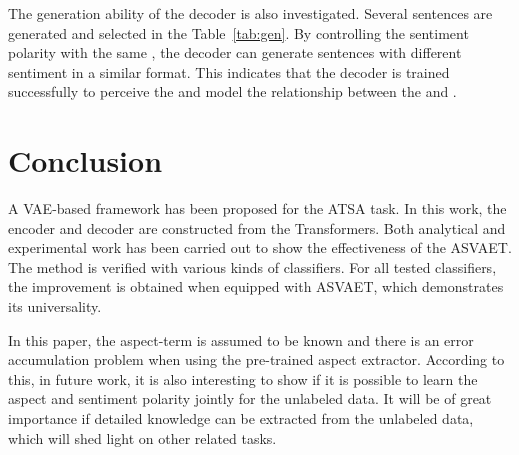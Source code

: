 \documentclass[11pt,a4paper]{article}
\begin{document}
The generation ability of the decoder is also investigated.
Several sentences are generated and selected in the Table~\ref{tab:gen}.
By controlling the sentiment polarity  with the same , the decoder can generate sentences with different sentiment in a similar format.
This indicates that the decoder is trained successfully to perceive the  and model the relationship between the  and .











\section{Conclusion}
A VAE-based framework has been proposed for the ATSA task.
In this work, the encoder and decoder are constructed from the Transformers.  Both analytical and experimental work has been carried out to show the effectiveness of the ASVAET.
The method is verified with various kinds of classifiers.
For all tested classifiers, the improvement is obtained when equipped with ASVAET, which demonstrates its universality.

In this paper, the aspect-term is assumed to be known and there is an error accumulation problem when using the pre-trained aspect extractor. According to this, in future work, it is also interesting to show if it is possible to learn the aspect and sentiment polarity jointly for the unlabeled data. It will be of great importance if detailed knowledge can be extracted from the unlabeled data, which will shed light on other related tasks.



\end{document}
